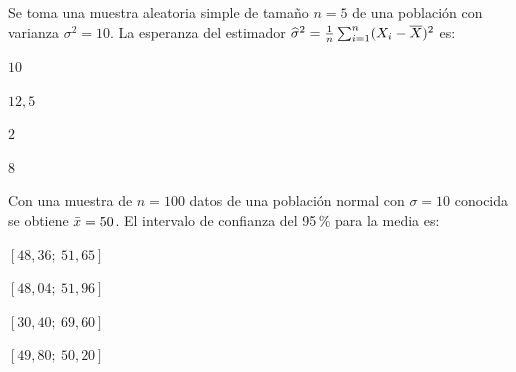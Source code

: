 \begin{cuestiones}
\item {} Se toma una muestra aleatoria simple de tamaño $n=5$ de una población con varianza $\sigma^{2}=10$. La esperanza del estimador $\widehat\sigma^{2}=\frac1n\sum_{i=1}^{n}(X_i-\overline{X})^{2}$ es:
\begin{opciones}
  \item $10$
  \item $12{,}5$
  \item $2$
  \item $8$
\end{opciones}

\item {} Con una muestra de $n=100$ datos de una población normal con $\sigma=10$ conocida se obtiene $\bar{x}=50$. El intervalo de confianza del 95\,\% para la media es:
\begin{opciones}
  \item $[48{,}36;\ 51{,}65]$
  \item $[48{,}04;\ 51{,}96]$
  \item $[30{,}40;\ 69{,}60]$
  \item $[49{,}80;\ 50{,}20]$
\end{opciones}
\end{cuestiones}

